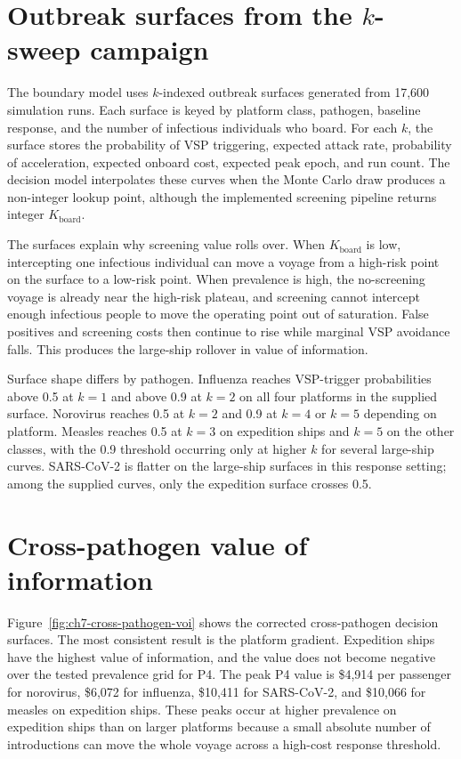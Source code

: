 \section{Outbreak surfaces from the $k$-sweep campaign}
The boundary model uses $k$-indexed outbreak surfaces generated from 17,600 simulation runs.
Each surface is keyed by platform class, pathogen, baseline response, and the number of infectious
individuals who board.
For each $k$, the surface stores the probability of VSP triggering, expected attack rate, probability
of acceleration, expected onboard cost, expected peak epoch, and run count.
The decision model interpolates these curves when the Monte Carlo draw produces a non-integer lookup
point, although the implemented screening pipeline returns integer $K_{\mathrm{board}}$.

The surfaces explain why screening value rolls over.
When $K_{\mathrm{board}}$ is low, intercepting one infectious individual can move a voyage from a
high-risk point on the surface to a low-risk point.
When prevalence is high, the no-screening voyage is already near the high-risk plateau, and screening
cannot intercept enough infectious people to move the operating point out of saturation.
False positives and screening costs then continue to rise while marginal VSP avoidance falls.
This produces the large-ship rollover in value of information.

Surface shape differs by pathogen.
Influenza reaches VSP-trigger probabilities above 0.5 at $k=1$ and above 0.9 at $k=2$ on all four
platforms in the supplied surface.
Norovirus reaches 0.5 at $k=2$ and 0.9 at $k=4$ or $k=5$ depending on platform.
Measles reaches 0.5 at $k=3$ on expedition ships and $k=5$ on the other classes, with the 0.9
threshold occurring only at higher $k$ for several large-ship curves.
SARS-CoV-2 is flatter on the large-ship surfaces in this response setting; among the supplied curves,
only the expedition surface crosses 0.5.

\section{Cross-pathogen value of information}
Figure~\ref{fig:ch7-cross-pathogen-voi} shows the corrected cross-pathogen decision surfaces.
The most consistent result is the platform gradient.
Expedition ships have the highest value of information, and the value does not become negative over
the tested prevalence grid for P4.
The peak P4 value is \$4,914 per passenger for norovirus, \$6,072 for influenza, \$10,411 for
SARS-CoV-2, and \$10,066 for measles on expedition ships.
These peaks occur at higher prevalence on expedition ships than on larger platforms because a small
absolute number of introductions can move the whole voyage across a high-cost response threshold.

